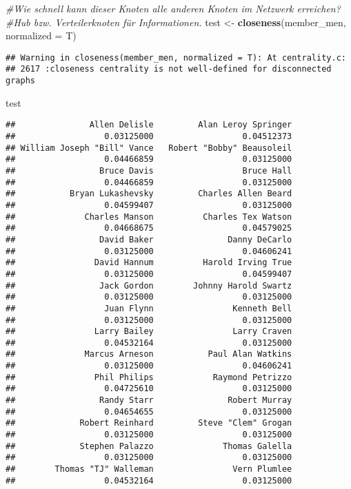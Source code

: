 \documentclass[
]{article}
\newenvironment{Shaded}{\begin{snugshade}}{\end{snugshade}}
\newcommand{\CommentTok}[1]{\textcolor[rgb]{0.56,0.35,0.01}{\textit{#1}}}
\newcommand{\DataTypeTok}[1]{\textcolor[rgb]{0.13,0.29,0.53}{#1}}
\newcommand{\KeywordTok}[1]{\textcolor[rgb]{0.13,0.29,0.53}{\textbf{#1}}}
\newcommand{\NormalTok}[1]{#1}
\newcommand{\StringTok}[1]{\textcolor[rgb]{0.31,0.60,0.02}{#1}}
\begin{document}
\begin{Shaded}
\begin{Highlighting}[]
\CommentTok{#Wie schnell kann dieser Knoten alle anderen Knoten im Netzwerk erreichen? }
\CommentTok{#Hub bzw. Verteilerknoten für Informationen.}
\NormalTok{test <-}\StringTok{ }\KeywordTok{closeness}\NormalTok{(member_men, }\DataTypeTok{normalized =}\NormalTok{ T)}
\end{Highlighting}
\end{Shaded}

\begin{verbatim}
## Warning in closeness(member_men, normalized = T): At centrality.c:
## 2617 :closeness centrality is not well-defined for disconnected graphs
\end{verbatim}

\begin{Shaded}
\begin{Highlighting}[]
\NormalTok{test}
\end{Highlighting}
\end{Shaded}

\begin{verbatim}
##               Allen Delisle         Alan Leroy Springer 
##                  0.03125000                  0.04512373 
## William Joseph "Bill" Vance   Robert "Bobby" Beausoleil 
##                  0.04466859                  0.03125000 
##                 Bruce Davis                  Bruce Hall 
##                  0.04466859                  0.03125000 
##           Bryan Lukashevsky         Charles Allen Beard 
##                  0.04599407                  0.03125000 
##              Charles Manson          Charles Tex Watson 
##                  0.04668675                  0.04579025 
##                 David Baker               Danny DeCarlo 
##                  0.03125000                  0.04606241 
##                David Hannum          Harold Irving True 
##                  0.03125000                  0.04599407 
##                 Jack Gordon        Johnny Harold Swartz 
##                  0.03125000                  0.03125000 
##                  Juan Flynn                Kenneth Bell 
##                  0.03125000                  0.03125000 
##                Larry Bailey                Larry Craven 
##                  0.04532164                  0.03125000 
##              Marcus Arneson           Paul Alan Watkins 
##                  0.03125000                  0.04606241 
##                Phil Philips            Raymond Petrizzo 
##                  0.04725610                  0.03125000 
##                 Randy Starr               Robert Murray 
##                  0.04654655                  0.03125000 
##             Robert Reinhard         Steve "Clem" Grogan 
##                  0.03125000                  0.03125000 
##             Stephen Palazzo              Thomas Galella 
##                  0.03125000                  0.03125000 
##        Thomas "TJ" Walleman                Vern Plumlee 
##                  0.04532164                  0.03125000
\end{verbatim}
\end{document}
